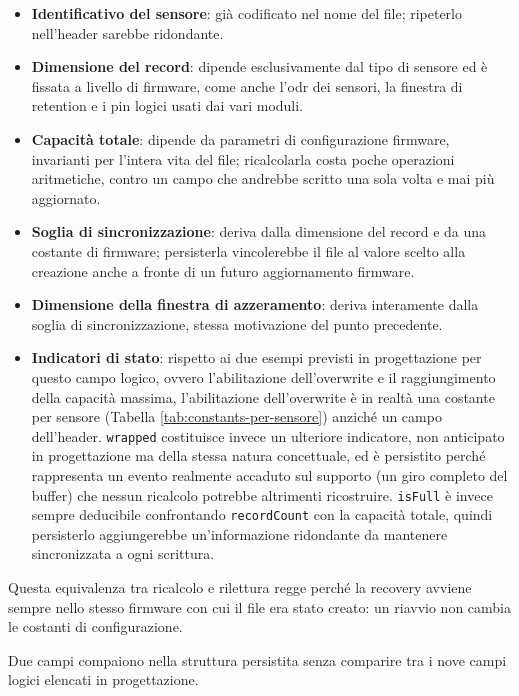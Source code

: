 \begin{itemize}
    \item \textbf{Identificativo del sensore}: già codificato nel nome del
    file; ripeterlo nell'header sarebbe ridondante.
    \item \textbf{Dimensione del record}: dipende esclusivamente dal tipo di
    sensore ed è fissata a livello di firmware, come anche l'\gls{odr} dei 
    sensori, la finestra di retention e i pin logici usati dai vari moduli.
    \item \textbf{Capacità totale}: dipende da parametri di configurazione firmware,
     invarianti per l'intera vita del file; ricalcolarla
    costa poche operazioni aritmetiche, contro un campo che andrebbe scritto
    una sola volta e mai più aggiornato.
    \item \textbf{Soglia di sincronizzazione}: deriva dalla dimensione del
    record e da una costante di firmware; persisterla vincolerebbe il file al
    valore scelto alla creazione anche a fronte di un futuro aggiornamento
    firmware.
    \item \textbf{Dimensione della finestra di azzeramento}: deriva
    interamente dalla soglia di sincronizzazione, stessa motivazione del punto
    precedente.
    \item \textbf{Indicatori di stato}: rispetto ai due esempi previsti in 
    progettazione per questo campo logico, ovvero l’abilitazione dell’overwrite 
    e il raggiungimento della capacità massima, l’abilitazione dell’overwrite è 
    in realtà una costante per sensore (Tabella \ref{tab:constants-per-sensore})
     anziché un campo dell’header. \texttt{wrapped} costituisce invece un ulteriore 
     indicatore, non anticipato in progettazione ma della stessa natura concettuale, 
     ed è persistito perché rappresenta un evento realmente accaduto sul supporto
      (un giro completo del buffer) che nessun ricalcolo potrebbe altrimenti ricostruire. 
      \texttt{isFull} è invece sempre deducibile confrontando \texttt{recordCount} 
      con la capacità totale, quindi persisterlo aggiungerebbe un’informazione 
      ridondante da mantenere sincronizzata a ogni scrittura.
\end{itemize}

Questa equivalenza tra ricalcolo e rilettura regge perché la recovery avviene
sempre nello stesso firmware con cui il file era stato creato: un riavvio non
cambia le costanti di configurazione.

Due campi compaiono nella struttura persistita senza comparire tra i nove
campi logici elencati in progettazione. 

